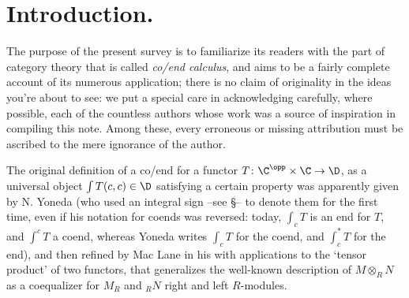 \maketitle

{\small \tableofcontents}

\section*{Introduction.}
The purpose of the present survey is to familiarize its readers with the part of category theory that is called \emph{co/end calculus}, and aims to be a fairly complete account of its numerous application; there is no claim of originality in the ideas you're about to see: we put a special care in acknowledging carefully, where possible, each of the countless authors whose work was a source of inspiration in compiling this note. Among these, every erroneous or missing attribution must be ascribed to the mere ignorance of the author.

The original definition of a co/end for a functor $T\colon \C^\opp\times \C\to \D$, as a universal object $\int T(c,c)\in \D$ satisfying a certain property was apparently given by N\@. Yoneda (who used an integral sign --see §-- to denote them for the first time, even if his notation for coends was reversed: today, $\int_c T$ is an end for $T$, and $\int^c T$ a coend, whereas Yoneda writes $\int_c T$ for the coend, and $\int_c^*T$ for the end), and then refined by Mac Lane in his \cite{mac1970milgram} with applications to the `tensor product' of two functors, that generalizes the well-known description of $M\otimes_R N$ as a coequalizer for $M_R$ and ${}_RN$ right and left $R$\hyp{}modules.

